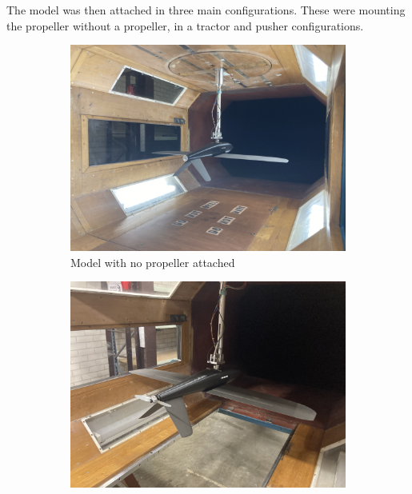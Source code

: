 

The model was then attached in three main configurations. These were mounting the propeller without a propeller, in a tractor and pusher configurations.


\begin{figure}[H]
     \centering
     \begin{subfigure}[b]{0.3\textwidth}
         \centering
         \includegraphics[scale=0.03]{04_Methodology/Figs/noprop}
         \caption{Model with no propeller attached}
          \label{fig:noprop}
     \end{subfigure}
     \hfill
     \begin{subfigure}[b]{0.3\textwidth}
             \centering
             \includegraphics[scale = 0.03]{04_Methodology/Figs/pusher}

\end{subfigure}
\end{figure}
